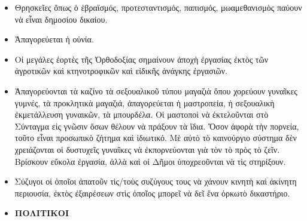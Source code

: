 \documentclass[a4paper]{article}
\begin{document}
\begin{itemize}
\item Θρησκεῖες ὅπως ὁ ἑβραϊσμός, προτεσταντισμός, παπισμός, μωαμεθανισμὸς παύουν νὰ εἶναι δημοσίου δικαίου. 
\item Ἀπαγορεύεται ἡ οὐνία. 
\item Οἱ μεγάλες ἑορτὲς τῆς Ὀρθοδοξίας σημαίνουν ἀποχὴ ἐργασίας ἐκτὸς τῶν ἀγροτικῶν καὶ κτηνοτροφικῶν καὶ εἰδικῆς ἀνάγκης ἐργασιῶν.
\item Ἀπαγορεύονται τὰ καζίνο τὰ σεξουαλικοῦ τύπου μαγαζιὰ ὅπου χορεύουν γυναῖκες γυμνές, τὰ προκλητικὰ μαγαζιά, ἀπαγορεύεται ἡ μαστροπεία, ἡ σεξουαλικὴ ἐκμετάλλευση γυναικῶν, τὰ μπουρδέλα. Οἱ μαστοποὶ νὰ ἐκτελοῦνται στὸ Σύνταγμα εἰς γνῶσιν ὅσων θέλουν νὰ πράξουν τὰ ἴδια. Ὅσον ἀφορὰ τὴν πορνεία, τοῦτο εἶναι προσωπικὸ ζήτημα καὶ ἰδιωτικό. Μὲ αὐτὸ τὸ καινούργιο σύστημα δὲν χρειάζονται οἱ δυστυχεῖς γυναῖκες νὰ ἐκπορνεύονται γιὰ τὸν τὸ πρὸς τὸ ζεῖν. Βρίσκουν εὔκολα ἐργασία, ἀλλὰ καὶ οἱ Δῆμοι ὑποχρεοῦνται νὰ τὶς στηρίξουν.
\item Σύζυγοι οἱ ὁποῖοι ἀπατοῦν τὶς/τοὺς συζύγους τους νὰ χάνουν κινητὴ καὶ ἀκίνητη περιουσία, ἐκτὸς ἐξαιρέσεων στὶς ὁποῖος μπορεῖ νὰ δεῖ ἕνα ὁρκωτὸ δικαστήριο.

\item  \textbf{ΠΟΛΙΤΙΚΟΙ}


\end{itemize}
\end{document}
